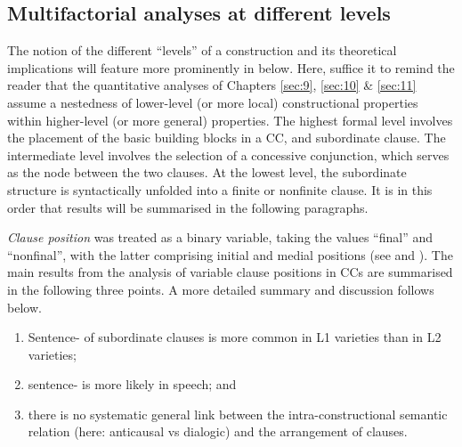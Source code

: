 \subsection{Multifactorial analyses at different levels}\label{sec:12.1.2}\label{bkm:Ref82434670}

The notion of the different “levels” of a construction and its theoretical implications will feature more prominently in  below. Here, suffice it to remind the reader that the quantitative analyses of Chapters \ref{sec:9}, \ref{sec:10} \& \ref{sec:11} assume a nestedness of lower-level (or more local) constructional properties within higher-level (or more general) properties. The highest formal level involves the placement of the basic building blocks in a CC,  and subordinate clause. The intermediate level involves the selection of a concessive conjunction, which serves as the node between the two clauses. At the lowest level, the subordinate structure is syntactically unfolded into a finite or nonfinite clause. It is in this order that results will be summarised in the following paragraphs.

\emph{Clause position} was treated as a binary variable, taking the values “final” and “nonfinal”, with the latter comprising initial and medial positions (see  and ). The main results from the analysis of variable clause positions in CCs are summarised in the following three points. A more detailed summary and discussion follows below.

\begin{enumerate}
  \item Sentence- of subordinate clauses is more common in L1 varieties than in L2 varieties;
  \item sentence- is more likely in speech; and
  \item there is no systematic general link between the intra-constructional semantic relation (here: anticausal vs dialogic) and the arrangement of clauses.
\end{enumerate}

